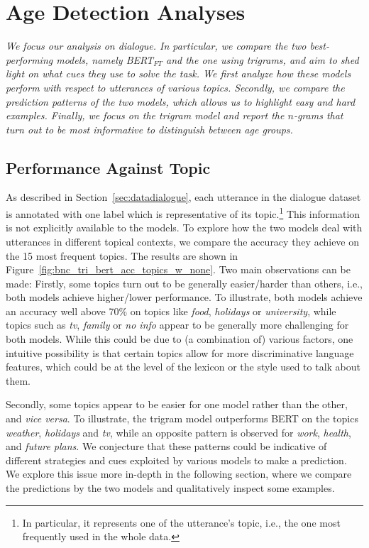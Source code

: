 \section{Age Detection Analyses}
\label{sec:exp1_analyses}
\textit{We focus our analysis on dialogue. In particular, we compare the two best-performing models, namely BERT$_{FT}$
and the one using trigrams, and aim to shed light on  what cues they use to solve the task.
We first analyze how these models perform with respect to utterances of various topics.
Secondly, we compare the prediction patterns of the two models, which allows us to highlight easy and hard examples.
Finally, we focus on the trigram model and report the $n$-grams that turn out to be most informative to distinguish between age groups.
}

\subsection{Performance Against Topic}

As described in Section~\ref{sec:datadialogue}, each utterance in the dialogue dataset is annotated with one label which is representative of its topic.\footnote{In particular, it represents one of the utterance's topic, i.e., the one most frequently used in the whole data.} This information is not explicitly available to the models.
To explore how the two models deal with utterances in different topical contexts, we compare the accuracy they achieve on the 15 most frequent topics. The results are shown in Figure~\ref{fig:bnc_tri_bert_acc_topics_w_none}. Two main observations can be made: Firstly, some topics turn out to be generally easier/harder than others, i.e., both models achieve higher/lower performance. To illustrate, both models achieve an accuracy well above 70\% on topics like \emph{food}, \emph{holidays} or \emph{university}, while topics such as \emph{tv}, \emph{family} or \emph{no info} appear to be generally more challenging for both models. While this could be due to (a combination of) various factors, one intuitive possibility is that certain topics allow for more discriminative language features, which could be at the level of the lexicon or the style used to talk about them.

Secondly, some topics appear to be easier for one model rather than the other, and \emph{vice versa}. To illustrate, the trigram model outperforms BERT on the topics \emph{weather}, \emph{holidays} and \emph{tv}, while an opposite pattern is observed for \emph{work}, \emph{health}, and \emph{future plans}. We conjecture that these patterns could be indicative of different strategies and cues exploited by various models to make a prediction. We explore this issue more in-depth in the following section, where we compare the predictions by the two models and qualitatively inspect some examples.

